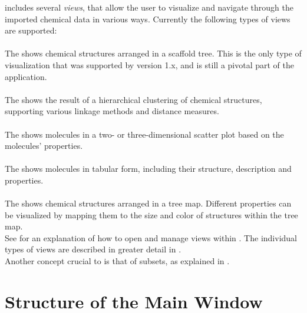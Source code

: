 \sh includes several \emph{views}, that allow the user to visualize and navigate through the imported chemical data in various ways.
Currently the following types of views are supported:

\paragraph{\Stview}
The \stview shows chemical structures arranged in a scaffold tree.
This is the only type of visualization that was supported by \sh version 1.x, and is still a pivotal part of the application.

\paragraph{\Dview}
The \dview shows the result of a hierarchical clustering of chemical structures, supporting various linkage methods and distance measures.

\paragraph{\Pview}
The \pview shows molecules in a two- or three-dimensional scatter plot based on the molecules' properties.

\paragraph{\Tview}
The \tview shows molecules in tabular form, including their structure, description and properties.

\paragraph{\Tmview}
The \tmview shows chemical structures arranged in a tree map. Different properties can be visualized by mapping them to the size and color of structures within the tree map.
\\

See  for an explanation of how to open and manage views within \sh.
The individual types of views are described in greater detail in .
\\
Another concept crucial to \sh is that of subsets, as explained in .

\section{Structure of the Main Window}

